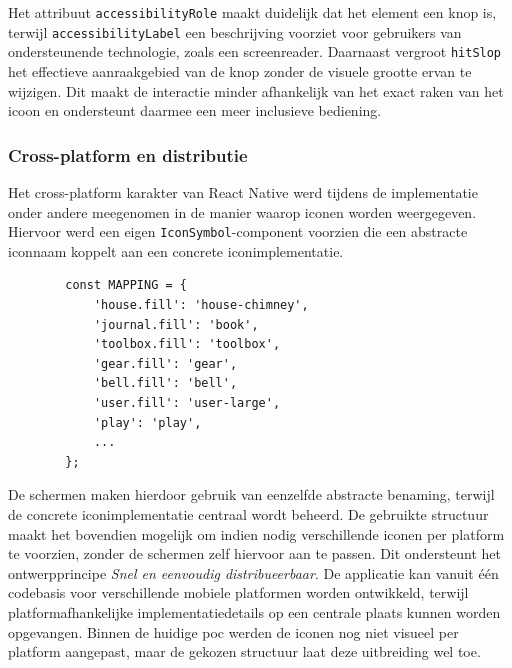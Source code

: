 Het attribuut \texttt{accessibilityRole} maakt duidelijk dat het element een knop is, terwijl \texttt{accessibilityLabel} een beschrijving voorziet voor gebruikers van ondersteunende technologie, zoals een screenreader. Daarnaast vergroot \texttt{hitSlop} het effectieve aanraakgebied van de knop zonder de visuele grootte ervan te wijzigen. Dit maakt de interactie minder afhankelijk van het exact raken van het icoon en ondersteunt daarmee een meer inclusieve bediening.

\newpage

\subsubsection{Cross-platform en distributie}
\label{sec:cross-platform-code}

\vspace{1em}

Het cross-platform karakter van React Native werd tijdens de implementatie onder andere meegenomen in de manier waarop iconen worden weergegeven. Hiervoor werd een eigen \texttt{IconSymbol}-component voorzien die een abstracte iconnaam koppelt aan een concrete iconimplementatie.

\begin{listing}[H]
    \begin{verbatim}
        const MAPPING = {
            'house.fill': 'house-chimney',
            'journal.fill': 'book',
            'toolbox.fill': 'toolbox',
            'gear.fill': 'gear',
            'bell.fill': 'bell',
            'user.fill': 'user-large',
            'play': 'play',
            ...
        };
    \end{verbatim}
    \caption[Centraal beheerde iconmapping]
    {Centrale mapping waarbij abstracte iconnamen worden gekoppeld aan concrete iconimplementaties.}
    \label{lst:icon-mapping}
\end{listing}

De schermen maken hierdoor gebruik van eenzelfde abstracte benaming, terwijl de concrete iconimplementatie centraal wordt beheerd. De gebruikte structuur maakt het bovendien mogelijk om indien nodig verschillende iconen per platform te voorzien, zonder de schermen zelf hiervoor aan te passen. Dit ondersteunt het ontwerpprincipe \textit{Snel en eenvoudig distribueerbaar}. De applicatie kan vanuit één codebasis voor verschillende mobiele platformen worden ontwikkeld, terwijl platformafhankelijke implementatiedetails op een centrale plaats kunnen worden opgevangen. Binnen de huidige \acrshort{poc} werden de iconen nog niet visueel per platform aangepast, maar de gekozen structuur laat deze uitbreiding wel toe.

